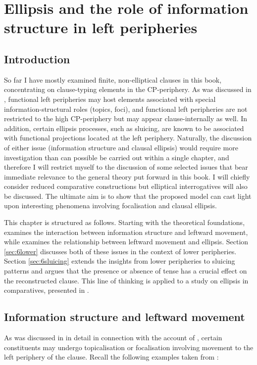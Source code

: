 \chapter{Ellipsis and the role of information structure in left peripheries} \label{ch:6}
\section{Introduction} \label{sec:6introduction}
So far I have mostly examined finite, non-elliptical clauses in this book, concentrating on clause-typing elements in the CP-periphery. As was discussed in , functional left peripheries may host elements associated with special information-structural roles (topics, foci), and functional left peripheries are not restricted to the high CP-periphery but may appear clause-internally as well. In addition, certain ellipsis processes, such as sluicing, are known to be associated with functional projections located at the left periphery. Naturally, the discussion of either issue (information structure and clausal ellipsis) would require more investigation than can possible be carried out within a single chapter, and therefore I will restrict myself to the discussion of some selected issues that bear immediate relevance to the general theory put forward in this book. I will chiefly consider reduced comparative constructions but elliptical interrogatives will also be discussed. The ultimate aim is to show that the proposed model can cast light upon interesting phenomena involving focalisation and clausal ellipsis.

This chapter is structured as follows. Starting with the theoretical foundations,  examines the interaction between information structure and leftward movement, while  examines the relationship between leftward movement and ellipsis. Section \ref{sec:6lower} discusses both of these issues in the context of lower peripheries. Section \ref{sec:6sluicing} extends the insights from lower peripheries to sluicing patterns and argues that the presence or absence of tense has a crucial effect on the reconstructed clause. This line of thinking is applied to a study on ellipsis in comparatives, presented in .

\section{Information structure and leftward movement} \label{sec:6information}
As was discussed in  in detail in connection with the account of \citet{rizzi1997}, certain constituents may undergo topicalisation or focalisation involving movement to the left periphery of the clause. Recall the following examples taken from \citet[285, ex. 1 and 2]{rizzi1997}:

